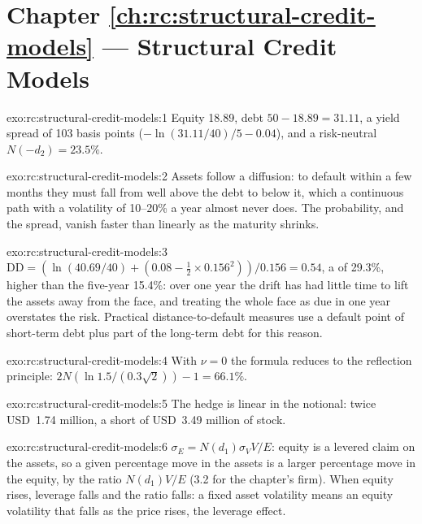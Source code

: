 \section*{Chapter \ref{ch:rc:structural-credit-models} --- Structural Credit Models}

\begin{solution}{exo:rc:structural-credit-models:1}
Equity 18.89, debt $50-18.89 = 31.11$, a yield spread of 103 basis points
($-\ln(31.11/40)/5-0.04$), and a risk-neutral  $N(-d_2) = 23.5\%$.
\end{solution}

\begin{solution}{exo:rc:structural-credit-models:2}
Assets follow a diffusion: to default within a few months they must fall from well above
the debt to below it, which a continuous path with a volatility of 10--20\% a year almost
never does. The probability, and the spread, vanish faster than linearly as the maturity
shrinks.
\end{solution}

\begin{solution}{exo:rc:structural-credit-models:3}
$\mathrm{DD} = (\ln(40.69/40)+(0.08-\tfrac12\times0.156^2))/0.156 = 0.54$, a  of 29.3\%, higher than the five-year 15.4\%: over one year the drift has had little
time to lift the assets away from the face, and treating the whole face as due in one year
overstates the risk. Practical distance-to-default measures use a default point of
short-term debt plus part of the long-term debt for this reason.
\end{solution}

\begin{solution}{exo:rc:structural-credit-models:4}
With $\nu = 0$ the formula reduces to the reflection principle: $2N(\ln1.5/(0.3\sqrt2))-1 =
66.1\%$.
\end{solution}

\begin{solution}{exo:rc:structural-credit-models:5}
The hedge is linear in the notional: twice USD~1.74 million, a short of USD~3.49 million
of stock.
\end{solution}

\begin{solution}{exo:rc:structural-credit-models:6}
$\sigma_E = N(d_1)\sigma_VV/E$: equity is a levered claim on the assets, so a given
percentage move in the assets is a larger percentage move in the equity, by the ratio
$N(d_1)V/E$ (3.2 for the chapter's firm). When equity rises, leverage falls and the ratio
falls: a fixed asset volatility means an equity volatility that falls as the price rises,
the leverage effect.
\end{solution}


